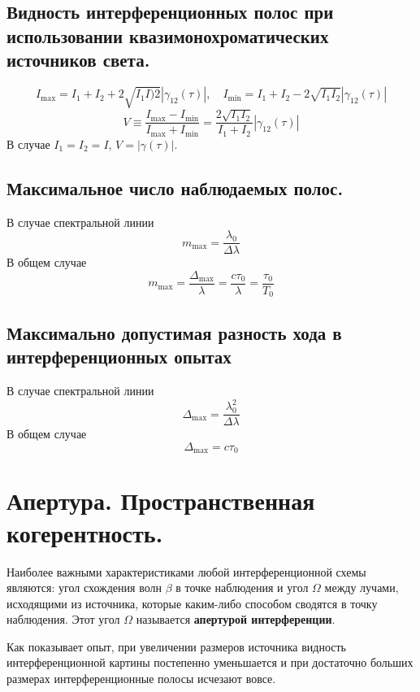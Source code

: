 \documentclass[a4paper, 12pt]{book}
\begin{document}
	\section{Видность интерференционных полос при использовании квазимонохроматических источников света.}
	\begin{equation*}
		I_{\max}=I_1+I_2+2\sqrt{I_1I)2}\left|\gamma_{12}\left(\tau\right)\right|,\quad I_{\min}=I_1+I_2-2\sqrt{I_1I_2}\left|\gamma_{12}\left(\tau\right)\right|
	\end{equation*}
	\begin{equation*}
		V\equiv\frac{I_{\max}-I_{\min}}{I_{\max}+I_{\min}}=\frac{2\sqrt{I_1I_2}}{I_1+I_2}\left|\gamma_{12}\left(\tau\right)\right|
	\end{equation*}
	В случае $I_1=I_2=I$, $V=\left|\gamma\left(\tau\right)\right|$.
	\section{Максимальное число наблюдаемых полос.}
	В случае спектральной линии
	\begin{equation*}
		m_{\max}=\frac{\lambda_0}{\Delta\lambda}
	\end{equation*}
	В общем случае
	\begin{equation*}
		m_{\max}=\frac{\Delta_{\max}}{\lambda}=\frac{c\tau_0}{\lambda}=\frac{\tau_0}{T_0}
	\end{equation*}
	\section{Максимально допустимая разность хода в интерференционных опытах}
	В случае спектральной линии
	\begin{equation*}
		\Delta_{\max}=\frac{\lambda_0^2}{\Delta\lambda}
	\end{equation*}
	В общем случае
	\begin{equation*}
		\Delta_{\max}=c\tau_0
	\end{equation*}
	\chapter{Апертура. Пространственная когерентность.}
	Наиболее важными характеристиками любой интерференционной схемы являются: угол схождения волн $\beta$ в точке наблюдения и угол $\Omega$ между лучами, исходящими из источника, которые каким-либо способом сводятся в точку наблюдения. Этот угол $\Omega$ называется \textbf{апертурой интерференции}.\par
	Как показывает опыт, при увеличении размеров источника видность интерференционной картины постепенно уменьшается и при достаточно больших размерах интерференционные полосы исчезают вовсе.
\end{document}
